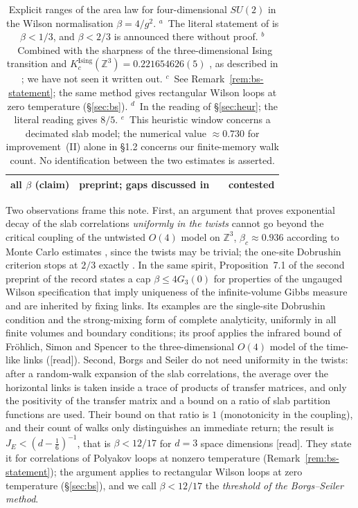 \documentclass[11pt,a4paper]{article}
\theoremstyle{plain}
\theoremstyle{remark}
\numberwithin{equation}{section}
\newcommand{\Z}{\mathbb{Z}}
\newcommand{\st}[1]{\textsf{[#1]}}
\begin{document}
\begin{table}[ht]
\begin{tabular}{@{}>{\raggedright\arraybackslash}p{}>{\raggedright\arraybackslash}p{}%
>{\raggedright\arraybackslash}p{}>{\raggedright\arraybackslash}p{}@{}}
all $\beta$ (claim) & preprint; gaps discussed in \cite{IS08} & \cite{Tom07} & contested \\
\bottomrule
\end{tabular}
\caption{Explicit ranges of the area law for four-dimensional $SU(2)$ in the Wilson normalisation $\beta=4/g^2$.
$^{a}$~The literal statement of \cite{DF80} is $\beta<1/3$, and $\beta<2/3$ is announced there without proof.
$^{b}$~Combined with the sharpness of the three-dimensional Ising transition and $K_c^{\mathrm{Ising}}(\Z^3)=0.221654626(5)$
\cite{FXL18}, as described in \cite[\S7.2]{D7}; we have not seen it written out. $^{c}$~See Remark~\ref{rem:bs-statement}; the same method gives rectangular Wilson loops at zero temperature (\S\ref{sec:bs}).
$^{d}$~In the reading of \S\ref{sec:heur}; the literal reading gives $8/5$.
$^{e}$~This heuristic window concerns a decimated slab model; the numerical value $\approx0.730$ for improvement~(II) alone in \S1.2 concerns our finite-memory walk count. No identification between the two estimates is asserted.}
\label{tab:ranges}
\end{table}

Two observations frame this note. First, an argument that proves exponential decay of the slab correlations \emph{uniformly in the
twists} cannot go beyond the critical coupling of the untwisted $O(4)$ model on $\Z^3$, $\beta_c\approx0.936$ according to
Monte Carlo estimates \cite{KK95,CH98}, since the twists may be trivial; the one-site Dobrushin criterion stops at $2/3$ exactly \cite[Remark~7.6]{D7}. In the same spirit, Proposition~7.1 of the second preprint of the record \cite{Raj26b} states a cap $\beta\le4G_3(0)$ for properties of the ungauged Wilson specification that imply uniqueness of the infinite-volume Gibbs measure and are inherited by fixing links. Its examples are the single-site Dobrushin condition and the strong-mixing form of complete analyticity, uniformly in all finite volumes and boundary conditions; its proof applies the infrared bound of Fr\"ohlich, Simon and Spencer to the three-dimensional $O(4)$ model of the time-like links (\st{read}).
Second, Borgs and Seiler \cite[Appendix~B]{BS83} do not need uniformity in the twists: after a random-walk expansion of the slab
correlations, the average over the horizontal links is taken inside a trace of products of transfer matrices, and only the positivity
of the transfer matrix and a bound on a ratio of slab partition functions are used. Their bound on that ratio is $1$ (monotonicity in
the coupling), and their count of walks only distinguishes an immediate return; the result is $J_E<(d-\frac16)^{-1}$, that is
$\beta<12/17$ for $d=3$ space dimensions \cite[(II.55), p.~343, and p.~376]{BS83} \st{read}. They state it for correlations of Polyakov loops at
nonzero temperature (Remark~\ref{rem:bs-statement}); the argument applies to rectangular Wilson loops at zero temperature
(\S\ref{sec:bs}), and we call $\beta<12/17$ the \emph{threshold of the Borgs--Seiler method}.
\end{document}

